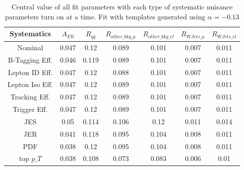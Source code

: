 \documentclass{cmspaperpdf}
\begin{document}
\begin{table}[htb]
\centering
\begin{tabular}{c|cc|cccc}
Systematics &      $A_{FB}$ &   $R_{q\bar{q}}$ & $R_{other\_bkg\_\mu}$ & $R_{other\_bkg\_el}$ & $R_{WJets\_\mu}$ & $R_{WJets\_el}$ \\
\hline
Nominal         &  0.047 &   0.12 &          0.089 &          0.101 &      0.007 &      0.011 \\
\hline
B-Tagging Eff.  &  0.046 &  0.119 &          0.089 &          0.101 &      0.007 &      0.011 \\
Lepton ID Eff.  &  0.047 &   0.12 &          0.088 &          0.101 &      0.007 &      0.011 \\
Lepton Iso Eff. &  0.047 &   0.12 &          0.089 &          0.101 &      0.007 &      0.011 \\
Tracking Eff.   &  0.047 &   0.12 &          0.089 &          0.101 &      0.007 &      0.011 \\
Trigger Eff.    &  0.047 &   0.12 &          0.089 &          0.101 &      0.007 &      0.011 \\
\hline
JES             &   0.05 &  0.114 &          0.106 &           0.12 &      0.011 &      0.014 \\
JER             &  0.041 &  0.118 &          0.095 &          0.104 &      0.008 &      0.011 \\
PDF             &  0.038 &   0.12 &          0.095 &          0.104 &      0.008 &      0.011 \\
\hline
top $p\_T$         &  0.038 &  0.108 &          0.073 &          0.083 &      0.006 &       0.01 \\
\hline
\end{tabular}
\caption{Central value of all fit parameters with each type of systematic nuisance parameters turn on at a time. Fit with templates generated using $\alpha=-0.13$}
\label{tab:sys-full-old-alpha}
\end{table}
\end{document}
